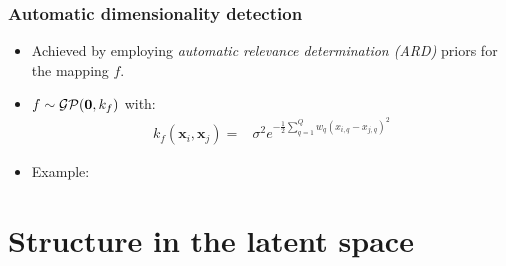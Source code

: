\documentclass{beamer}
\begin{document}
\begin{frame}
 \frametitle{Automatic dimensionality detection}
 \begin{itemize}
  \item Achieved by employing \emph{automatic relevance determination (ARD)} priors for the mapping $f$.
     \vspace{5pt}
  \item  $f \sim \mathcal{GP}(\mathbf{0}, k_f)$ with:
      \begin{align*}
      \mathit{k_f} \left( \mathbf{x}_i, \mathbf{x}_j \right) = {} &  
		\sigma^2 e^{
			- \frac{1}{2} \sum_{q=1}^{Q}  w_q \left(
                          \mathit{x_{i,q} - x_{j,q}} \right) ^2 }
    \end{align*}
 \item Example:
    \begin{figure}
    \begin{center}
    \hspace{5pt}
    \end{center}
    \end{figure}
\end{itemize}
\end{frame}


\section{Structure in the latent space}
\end{document}
